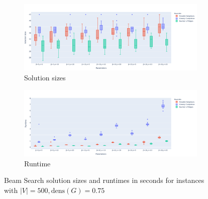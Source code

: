 \documentclass[draft,final]{vutinfth} %
\begin{document}

\begin{figure}
    \centering
    \begin{subfigure}{\textwidth}
        \centering
        \includegraphics[width=\textwidth]{graphics/lbh-075-500-size.pdf}
        \caption{Solution sizes}
    \end{subfigure}
    \begin{subfigure}{\textwidth}
        \centering
        \includegraphics[width=\textwidth]{graphics/lbh-075-500-runtime.pdf}
        \caption{Runtime}
    \end{subfigure}
    \caption{Beam Search solution sizes and runtimes in seconds for instances with $|V|=500, \mathrm{dens}(G)=0.75$}
    \label{fig:bs-heuristics-random-1}
\end{figure}
\end{document}
